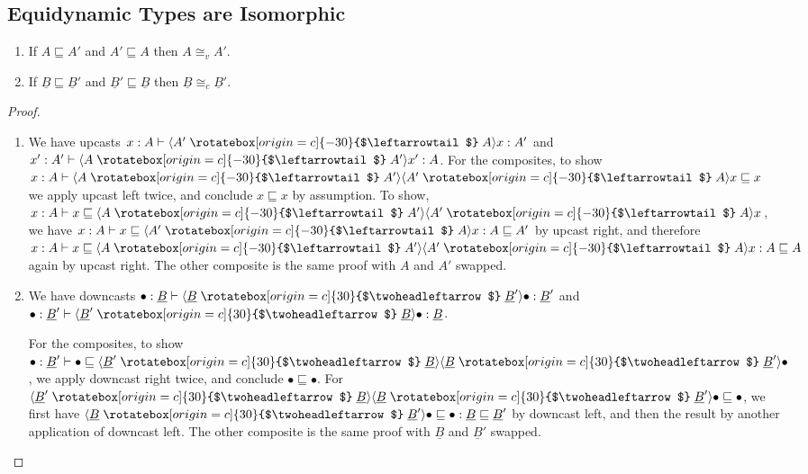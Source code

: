 \documentclass[acmsmall,screen,12pt]{acmart}
\renewcommand{\u}{\underline}
\newcommand{\ltdyn}{\sqsubseteq}
\newcommand{\uarrow}{\mathrel{\rotatebox[origin=c]{-30}{$\leftarrowtail$}}}
\newcommand{\darrow}{\mathrel{\rotatebox[origin=c]{30}{$\twoheadleftarrow$}}}
\newcommand{\upcast}[2]{\langle{#2}\uarrow{#1}\rangle}
\newcommand{\dncast}[2]{\langle{#1}\darrow{#2}\rangle}
\begin{document}
\begin{longonly}
\subsection{Equidynamic Types are Isomorphic}

\begin{theorem} 
  \begin{enumerate}
  \item
    If $A \ltdyn A'$ and $A' \ltdyn A$ then $A \cong_v A'$.
  \item
    If $\u B \ltdyn \u B'$ and $\u B' \ltdyn \u B$ then $\u B \cong_c \u B'$.
  \end{enumerate}
\end{theorem}
\begin{proof}
  \begin{enumerate}
  \item We have upcasts $x : A \vdash \upcast{A}{A'}{x} : A'$ and $x' : A' \vdash \upcast{A'}{A}{x'} : A$.
    For the composites, to show
    $x : A \vdash \upcast{A'}{A}{\upcast{A}{A'}{x}} \ltdyn x$
    we apply upcast left twice, and conclude $x \ltdyn x$ by assumption.
    To show, 
    $x : A \vdash x \ltdyn \upcast{A'}{A}{\upcast{A}{A'}{x}}$,
    we have $x : A \vdash x \ltdyn {\upcast{A}{A'}{x}} : A \ltdyn A'$
    by upcast right, and therefore
    $x : A \vdash x \ltdyn \upcast{A'}{A}{\upcast{A}{A'}{x}} : A \ltdyn A$
    again by upcast right.
    The other composite is the same proof with $A$ and $A'$ swapped.
    
  \item We have downcasts $\bullet : \u B \vdash \dncast{\u B}{\u B'}{\bullet} : \u B'$ and
    $\bullet : \u B' \vdash \dncast{\u B'}{\u B}{\bullet} : \u B$.

      For the composites, to show $\bullet : \u B' \vdash \bullet \ltdyn
      \dncast{\u B'}{\u B}{\dncast{\u B}{\u B'}}{\bullet}$, we apply
      downcast right twice, and conclude $\bullet \ltdyn \bullet$.  For
      $\dncast{\u B'}{\u B}{\dncast{\u B}{\u B'}}{\bullet} \ltdyn
      \bullet$, we first have $\dncast{\u B}{\u B'}{\bullet} \ltdyn
      \bullet : \u B \ltdyn \u B'$ by downcast left, and then the result
      by another application of downcast left.
      The other composite is the same proof with $\u B$ and $\u B'$ swapped.
  \end{enumerate}
\end{proof}
\end{longonly}
\end{document}
